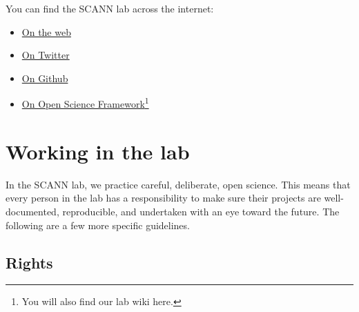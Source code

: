 \documentclass[
  12pt,
]{book}
\providecommand{\tightlist}{%
  \setlength{\itemsep}{0pt}\setlength{\parskip}{0pt}}
\begin{document}
You can find the SCANN lab across the internet:

\begin{itemize}
\tightlist
\item
  \href{https://scannlab.psych.ufl.edu}{On the web}
\item
  \href{https://twitter.com/scannlab}{On Twitter}
\item
  \href{https://github.com/scann-lab}{On Github}
\item
  \href{https://osf.io/4hbgz}{On Open Science Framework}\footnote{You will also find our lab wiki here.}
\end{itemize}

\hypertarget{working-in-the-lab}{%
\chapter{Working in the lab}\label{working-in-the-lab}}

In the SCANN lab, we practice careful, deliberate, open science. This means that every person in the lab has a responsibility to make sure their projects are well-documented, reproducible, and undertaken with an eye toward the future. The following are a few more specific guidelines.

\hypertarget{rights}{%
\section{Rights}\label{rights}}
\end{document}
